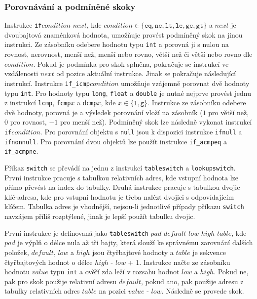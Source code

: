 \subsubsection{Porovnávání a podmíněné skoky}

Instrukce \texttt{if}$condition$ $next$, kde $condition \in \{ \texttt{eq}, \texttt{ne}, \texttt{lt}, \texttt{le}, \texttt{ge}, \texttt{gt}\}$ a $next$ je dvoubajtová znaménková hodnota, umožňuje provést podmíněný skok na jinou instrukci. Ze zásobníku odebere hodnotu typu \texttt{int} a porovná ji s nulou na rovnost, nerovnost, menší než, menší nebo rovno, větší než či větší nebo rovno dle $condition$. Pokud je podmínka pro skok splněna, pokračuje se instrukcí ve vzdálenosti $next$ od pozice aktuální instrukce. Jinak se pokračuje následující instrukcí. Instrukce \texttt{if\_icmp}$condition$ umožňuje vzájemně porovnat dvě hodnoty typu \texttt{int}.
 Pro hodnoty typu \texttt{long}, \texttt{float} a \texttt{double} je nutné nejprve provést jednu z instrukcí \texttt{lcmp}, \texttt{fcmp}$x$ a \texttt{dcmp}$x$, kde $x \in \{\texttt{l}, \texttt{g} \}$. Instrukce ze zásobníku odebere dvě hodnoty, porovná je a výsledek porovnání vloží na zásobník ($1$ pro větší než, $0$ pro rovnost, $-1$ pro menší než). Podmíněný skok lze následně vykonat instrukcí \texttt{if}$condition$.
Pro porovnání objektu s \texttt{null} jsou k dispozici instrukce \texttt{ifnull} a \texttt{ifnonnull}. Pro porovnání dvou objektů lze použít instrukce \texttt{if\_acmpeq} a \texttt{if\_acmpne}.

Příkaz \texttt{switch} se převádí na jednu z instrukcí \texttt{tableswitch} a \texttt{lookupswitch}. První instrukce pracuje s tabulkou relativních adres, kde vstupní hodnota lze přímo převést na index do tabulky. Druhá instrukce pracuje s tabulkou dvojic klíč-adresa, kde pro vstupní hodnotu je třeba nalézt dvojici s odpovídajícím klíčem. Tabulka adres je vhodnější, nejsou-li jednotlivé případy příkazu \texttt{switch} navzájem příliš rozptýlené, jinak je lepší použít tabulku dvojic.

První instrukce je definovaná jako \texttt{tableswitch} $pad$ $default$ $low$ $high$ $table$, kde $pad$ je výplň o délce nula až tři bajty, která slouží ke správnému zarovnání dalších položek, $default$, $low$ a $high$ jsou čtyřbajtové hodnoty a $table$ je sekvence čtyřbajtových hodnot o délce $high$ - $low$ + 1. Instrukce načte ze zásobníku hodnotu $value$ typu \texttt{int} a ověří zda leží v rozsahu hodnot $low$ a $high$. Pokud ne, pak pro skok použije relativní adresu $default$, pokud ano, pak použije adresu z tabulky relativních adres $table$ na pozici $value$ - $low$. Následně se provede skok.

